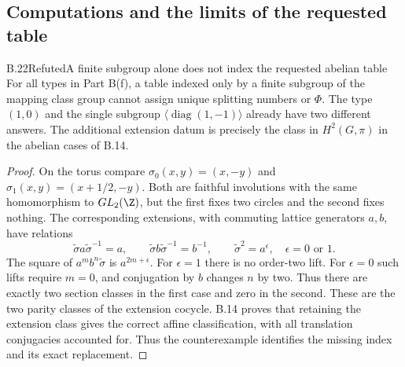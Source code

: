 \subsection{Computations and the limits of the requested table}

\begin{claim}{B.22}{Refuted}{A finite subgroup alone does not index the requested abelian table}
For all types in Part B(f), a table indexed only by a finite subgroup of the
mapping class group cannot assign unique splitting numbers or $\Phi$.
The type $(1,0)$ and the single subgroup
$\langle\operatorname{diag}(1,-1)\rangle$ already have two different answers.
The additional extension datum is precisely the class in $H^2(G,\pi)$ in the
abelian cases of B.14.
\end{claim}
\begin{proof}
On the torus compare
$\sigma_0(x,y)=(x,-y)$ and
$\sigma_1(x,y)=(x+1/2,-y)$. Both are faithful involutions with the same
homomorphism to $GL_2(\Z)$, but the first fixes two circles and the second fixes
nothing. The corresponding extensions, with commuting lattice generators
$a,b$, have relations
\[
 \widetilde\sigma a\widetilde\sigma^{-1}=a,\qquad
 \widetilde\sigma b\widetilde\sigma^{-1}=b^{-1},\qquad
 \widetilde\sigma^2=a^\epsilon,\quad \epsilon=0\text{ or }1.
\]
The square of $a^mb^n\widetilde\sigma$ is $a^{2m+\epsilon}$. For $\epsilon=1$
there is no order-two lift. For $\epsilon=0$ such lifts require $m=0$,
and conjugation by $b$ changes $n$ by two. Thus there are exactly two section
classes in the first case and zero in the second. These are the two parity
classes of the extension cocycle. B.14 proves that retaining the extension
class gives the correct affine classification, with all translation conjugacies
accounted for. Thus the counterexample identifies the missing index and its
exact replacement.
\end{proof}


